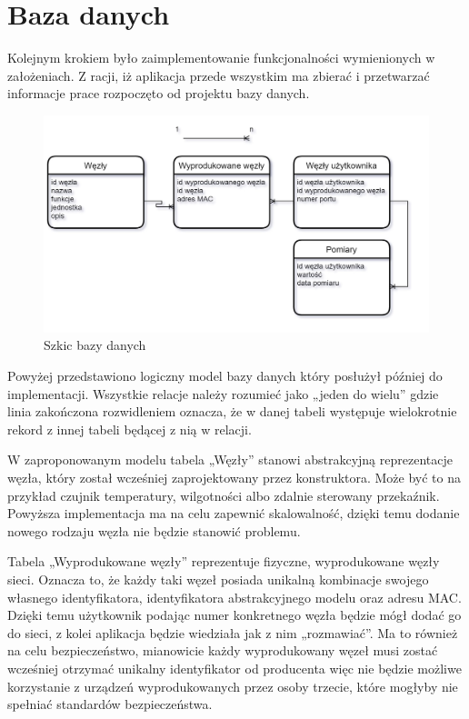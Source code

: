 \documentclass[12pt, twoside, openany]{mwrep}
\begin{document}
\section{Baza danych}
Kolejnym krokiem było zaimplementowanie funkcjonalności wymienionych w założeniach. Z racji, iż aplikacja przede wszystkim ma zbierać i przetwarzać informacje prace rozpoczęto od projektu bazy danych. 
\begin{figure}[H]
\centering
\includegraphics[scale=0.4]{db}
\caption{Szkic bazy danych}
\end{figure}
\par
Powyżej przedstawiono logiczny model bazy danych który posłużył później do implementacji. Wszystkie relacje należy rozumieć jako „jeden do wielu” gdzie linia zakończona rozwidleniem oznacza, że w danej tabeli występuje wielokrotnie rekord z innej tabeli będącej z nią w relacji. 
\par
W zaproponowanym modelu tabela „Węzły” stanowi abstrakcyjną reprezentacje węzła, który został wcześniej zaprojektowany przez konstruktora. Może być to na przykład czujnik temperatury, wilgotności albo zdalnie sterowany przekaźnik. Powyższa implementacja ma na celu zapewnić skalowalność, dzięki temu dodanie nowego rodzaju węzła nie będzie stanowić problemu. 
\par
Tabela „Wyprodukowane węzły” reprezentuje fizyczne, wyprodukowane węzły sieci. Oznacza to, że każdy taki węzeł posiada unikalną kombinacje swojego własnego identyfikatora, identyfikatora abstrakcyjnego modelu oraz adresu MAC. Dzięki temu użytkownik podając numer konkretnego węzła będzie mógł dodać go do sieci, z kolei aplikacja będzie wiedziała jak z nim „rozmawiać”. Ma to również na celu bezpieczeństwo, mianowicie każdy wyprodukowany węzeł musi zostać wcześniej otrzymać unikalny identyfikator od producenta więc nie będzie możliwe korzystanie z urządzeń wyprodukowanych przez osoby trzecie, które mogłyby nie spełniać standardów bezpieczeństwa.
\end{document}
